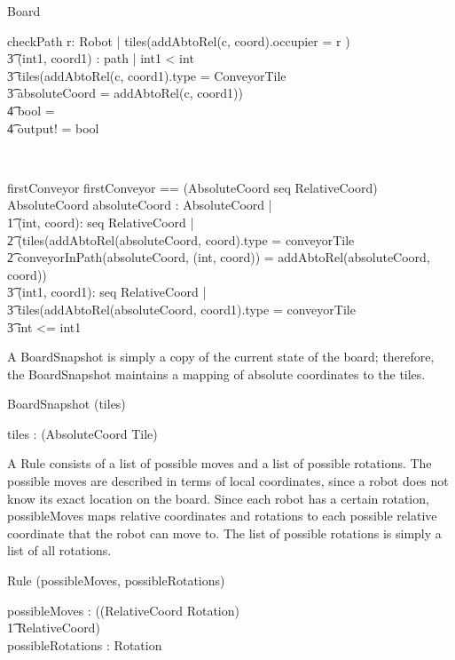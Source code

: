 \documentclass[12pt]{article}
\begin{document}
\begin{class}{Board}
\begin{schema}{checkPath}
\exists r: Robot | tiles(addAbtoRel(c, coord).occupier = r )\implies \\ \t3
\exists (int1, coord1) : path | int1 < int \\ \t3
tiles(addAbtoRel(c, coord1).type = ConveyorTile \\ \t3
absoluteCoord = addAbtoRel(c, coord1)) \implies \\ \t4
bool = \true \\ \t4
output! = bool
\end{schema} \\
\begin{schema}{firstConveyor}
firstConveyor == (AbsoluteCoord \cross seq RelativeCoord) \rightarrow AbsoluteCoord
\where
\exists absoluteCoord : AbsoluteCoord |  \\ \t1
\exists (int, coord): seq RelativeCoord |  \\ \t2
(tiles(addAbtoRel(absoluteCoord, coord).type = conveyorTile \\ \t2
conveyorInPath(absoluteCoord, (int, coord)) = addAbtoRel(absoluteCoord, coord)) \implies \\ \t3
\forall (int1, coord1): seq RelativeCoord | \\ \t3
\IF tiles(addAbtoRel(absoluteCoord, coord1).type = conveyorTile \\ \t3
\THEN int <= int1
\end{schema}
\end{class}

A BoardSnapshot is simply a copy of the current state of the board; therefore, the BoardSnapshot maintains a mapping of absolute coordinates to the tiles.
\begin{class}{BoardSnapshot}
\upharpoonright (tiles) \\
\begin{state}
tiles : \power (AbsoluteCoord \fun Tile) \\
\end{state}
\end{class}

A Rule consists of a list of possible moves and a list of possible rotations. The possible moves are described in terms of local coordinates, since a robot does not know its exact location on the board. Since each robot has a certain rotation, possibleMoves maps relative coordinates and rotations to each possible relative coordinate that the robot can move to. The list of possible rotations is simply a list of all rotations.
\begin{class}{Rule}
\upharpoonright (possibleMoves, possibleRotations) \\
\begin{state}
possibleMoves : \power ((RelativeCoord \times Rotation) \psurj \\ \t1 \seq RelativeCoord) \\
possibleRotations : \power Rotation
\end{state} \\
\end{class}
\end{document}
